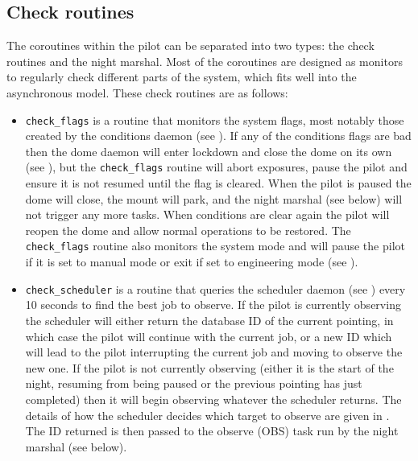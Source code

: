 \begin{colsection}
\begin{colsection}
\end{colsection}

\subsection{Check routines}
\label{sec:checks}
\begin{colsection}

The coroutines within the pilot can be separated into two types: the check routines and the night marshal. Most of the coroutines are designed as monitors to regularly check different parts of the system, which fits well into the asynchronous model. These check routines are as follows:

\begin{itemize}

\item \texttt{check\_flags} is a routine that monitors the system flags, most notably those created by the conditions daemon (see ). If any of the conditions flags are bad then the dome daemon will enter lockdown and close the dome on its own (see ), but the \texttt{check\_flags} routine will abort exposures, pause the pilot and ensure it is not resumed until the flag is cleared. When the pilot is paused the dome will close, the mount will park, and the night marshal (see below) will not trigger any more tasks. When conditions are clear again the pilot will reopen the dome and allow normal operations to be restored. The \texttt{check\_flags} routine also monitors the system mode and will pause the pilot if it is set to manual mode or exit if set to engineering mode (see ).

\item \texttt{check\_scheduler} is a routine that queries the scheduler daemon (see ) every 10 seconds to find the best job to observe. If the pilot is currently observing the scheduler will either return the database ID of the current pointing, in which case the pilot will continue with the current job, or a new ID which will lead to the pilot interrupting the current job and moving to observe the new one. If the pilot is not currently observing (either it is the start of the night, resuming from being paused or the previous pointing has just completed) then it will begin observing whatever the scheduler returns. The details of how the scheduler decides which target to observe are given in . The ID returned is then passed to the observe (OBS) task run by the night marshal (see below).


\end{itemize}
\end{colsection}
\end{colsection}
